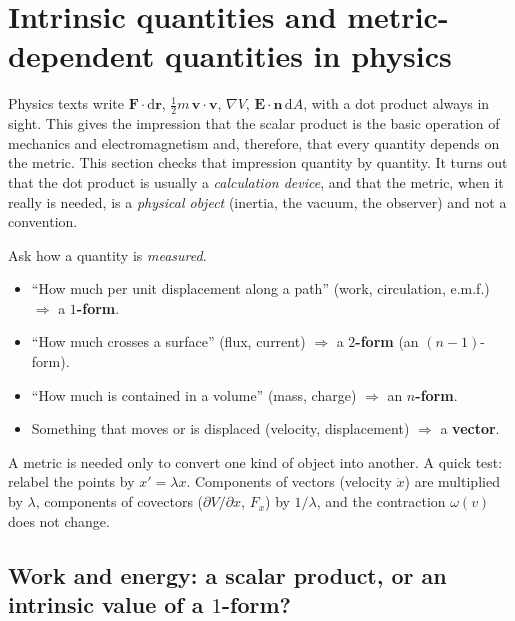 \documentclass[11pt,a4paper]{article}
\numberwithin{equation}{section}
\theoremstyle{definition}
\theoremstyle{plain}
\newcommand{\dd}{\mathrm{d}}
\begin{document}
\section{Intrinsic quantities and metric-dependent quantities in physics}\label{sec:phys}

Physics texts write $\mathbf F\cdot\dd\mathbf r$, $\frac12m\,\mathbf v\cdot\mathbf v$, $\nabla V$, $\mathbf E\cdot\mathbf n\,\dd A$, with a dot product always in sight. This gives the impression that the scalar product is the
basic operation of mechanics and electromagnetism and, therefore, that every quantity depends on the metric. This section checks that impression quantity by quantity. It turns out that the dot product is usually a \emph{calculation device}, and that
the metric, when it really is needed, is a \emph{physical object} (inertia, the vacuum, the observer) and not a convention.

\begin{keyidea}
Ask how a quantity is \emph{measured}.
\begin{itemize}
\item ``How much per unit displacement along a path'' (work, circulation, e.m.f.) $\Rightarrow$ a \textbf{$1$-form}.
\item ``How much crosses a surface'' (flux, current) $\Rightarrow$ a \textbf{$2$-form} (an $(n{-}1)$-form).
\item ``How much is contained in a volume'' (mass, charge) $\Rightarrow$ an \textbf{$n$-form}.
\item Something that moves or is displaced (velocity, displacement) $\Rightarrow$ a \textbf{vector}.
\end{itemize}
A metric is needed only to convert one kind of object into another. A quick test: relabel the points by $x'=\lambda x$. Components of vectors (velocity $\dot x$) are multiplied by $\lambda$, components of covectors ($\partial V/\partial x$, $F_x$) by $1/\lambda$, and the contraction $\omega(v)$ does not change.
\end{keyidea}

\subsection{Work and energy: a scalar product, or an intrinsic value of a $1$-form?}\label{sec:phys-work}
\end{document}
